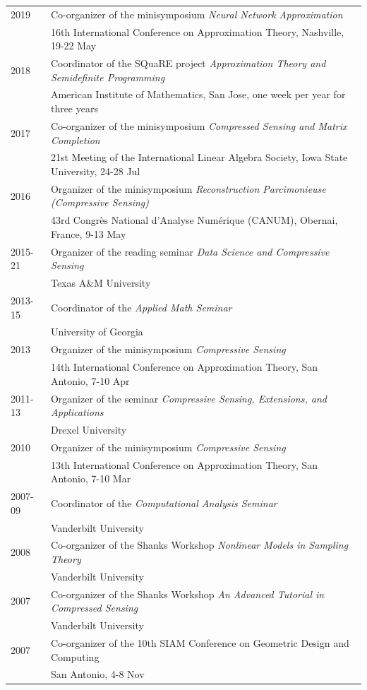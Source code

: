 \documentclass[11pt]{article}
\begin{document}
\begin{tabular}{ll}
2019 & Co-organizer of the minisymposium {\sl Neural Network Approximation}\\
& 16th International Conference on Approximation Theory, Nashville, 19-22 May\\
2018 & Coordinator of the SQuaRE project {\sl Approximation Theory and Semidefinite Programming}\\
& American Institute of Mathematics, San Jose, one week per year for three years\\
2017 & Co-organizer of the minisymposium {\sl Compressed Sensing and Matrix Completion}\\
& 
21st Meeting of the International Linear Algebra Society,
Iowa State University, 24-28 Jul\\
2016 & Organizer of the minisymposium {\sl Reconstruction Parcimonieuse (Compressive Sensing)}\\
& 43rd Congr\`{e}s National d'Analyse Num\'{e}rique (CANUM), Obernai, France, 9-13 May\\
2015-21 & Organizer of the reading seminar {\sl Data Science and Compressive Sensing}\\
& Texas A\&M University\\
2013-15 & Coordinator of the {\sl Applied Math Seminar}\\
& University of Georgia\\
2013 & Organizer of the minisymposium {\sl Compressive Sensing}\\
& 14th International Conference on Approximation Theory, San Antonio, 7-10 Apr\\
2011-13 & Organizer of the seminar {\sl Compressive Sensing, Extensions, and Applications}\\
& Drexel University\\
2010 & Organizer of the minisymposium {\sl Compressive Sensing}\\
& 13th International Conference on Approximation Theory, San Antonio, 7-10 Mar\\
2007-09 & Coordinator of the {\sl Computational Analysis Seminar}\\
& Vanderbilt University\\
2008\phantom{-09} & Co-organizer of the Shanks Workshop {\sl Nonlinear Models in Sampling Theory}\\
& Vanderbilt University\\
2007 & Co-organizer of the Shanks Workshop {\sl An Advanced Tutorial in Compressed Sensing}\\
& Vanderbilt University\\
2007 &  Co-organizer of the 10th SIAM Conference on Geometric Design and Computing\\
& San Antonio, 4-8 Nov
\end{tabular}
\end{document}
